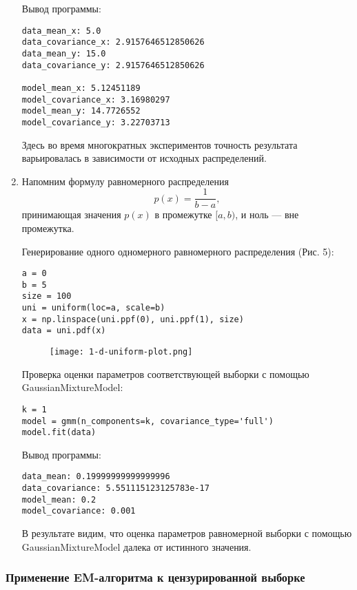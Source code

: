 \begin{enumerate}
{        Вывод программы:
        \begin{verbatim}
data_mean_x: 5.0
data_covariance_x: 2.9157646512850626
data_mean_y: 15.0
data_covariance_y: 2.9157646512850626

model_mean_x: 5.12451189
model_covariance_x: 3.16980297
model_mean_y: 14.7726552
model_covariance_y: 3.22703713
        \end{verbatim}

        Здесь во время многократных экспериментов точность результата варьировалась в зависимости от исходных распределений.
    }
    \item {
        Напомним формулу равномерного распределения
        $$p(x) = \frac{1}{b - a},$$
        принимающая значения $p(x)$ в промежутке $[a, b)$, и ноль --- вне промежутка.

        Генерирование одного одномерного равномерного распределения (Рис. 5):
        \begin{verbatim}
a = 0
b = 5
size = 100
uni = uniform(loc=a, scale=b)
x = np.linspace(uni.ppf(0), uni.ppf(1), size)
data = uni.pdf(x)
        \end{verbatim}
        
        \begin{figure}[h]
            \begin{center}
                \texttt{[image: 1-d-uniform-plot.png]}
                \caption{}
                \label{ris:experimcoded}
            \end{center}
        \end{figure}

        Проверка оценки параметров соответствующей выборки с помощью GaussianMixtureModel:
        \begin{verbatim}
k = 1
model = gmm(n_components=k, covariance_type='full')
model.fit(data)
        \end{verbatim}

        Вывод программы:
        \begin{verbatim}
data_mean: 0.19999999999999996
data_covariance: 5.551115123125783e-17
model_mean: 0.2
model_covariance: 0.001
        \end{verbatim}

        В результате видим, что оценка параметров равномерной выборки с помощью GaussianMixtureModel далека от истинного значения.
    }
\end{enumerate}

\subsubsection{Применение EM-алгоритма к цензурированной выборке}

